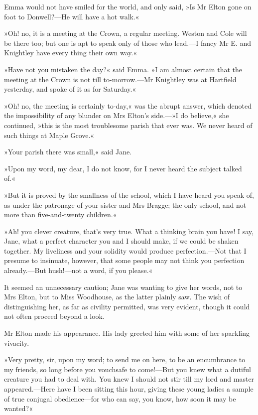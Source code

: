 Emma would not have smiled for the world, and only said, »Is Mr Elton gone on foot to Donwell?—He will have a hot walk.«

»Oh! no, it is a meeting at the Crown, a regular meeting. Weston and Cole will be there too; but one is apt to speak only of those who lead.—I fancy Mr E. and Knightley have every thing their own way.«

»Have not you mistaken the day?« said Emma. »I am almost certain that the meeting at the Crown is not till to-morrow.—Mr Knightley was at Hartfield yesterday, and spoke of it as for Saturday.«

»Oh! no, the meeting is certainly to-day,« was the abrupt answer, which denoted the impossibility of any blunder on Mrs Elton's side.—»I do believe,« she continued, »this is the most troublesome parish that ever was. We never heard of such things at Maple Grove.«

»Your parish there was small,« said Jane.

»Upon my word, my dear, I do not know, for I never heard the subject talked of.«

»But it is proved by the smallness of the school, which I have heard you speak of, as under the patronage of your sister and Mrs Bragge; the only school, and not more than five-and-twenty children.«

»Ah! you clever creature, that's very true. What a thinking brain you have! I say, Jane, what a perfect character you and I should make, if we could be shaken together. My liveliness and your solidity would produce perfection.—Not that I presume to insinuate, however, that some people may not think you perfection already.—But hush!—not a word, if you please.«

It seemed an unnecessary caution; Jane was wanting to give her words, not to Mrs Elton, but to Miss Woodhouse, as the latter plainly saw. The wish of distinguishing her, as far as civility permitted, was very evident, though it could not often proceed beyond a look.

Mr Elton made his appearance. His lady greeted him with some of her sparkling vivacity.

»Very pretty, sir, upon my word; to send me on here, to be an encumbrance to my friends, so long before you vouchsafe to come!—But you knew what a dutiful creature you had to deal with. You knew I should not stir till my lord and master appeared.—Here have I been sitting this hour, giving these young ladies a sample of true conjugal obedience—for who can say, you know, how soon it may be wanted?«

